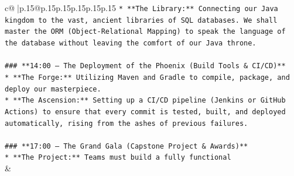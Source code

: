 \documentclass{article}
\begin{document}
{\begin{supertabular}{c@{$\;$}|p{.15\linewidth}@{}p{.15\linewidth}p{.15\linewidth}p{.15\linewidth}p{.15\linewidth}p{.15\linewidth}}
{{{\texttt{*   **The Library:** Connecting our Java kingdom to the vast, ancient libraries of SQL databases. We shall master the ORM (Object{-}Relational Mapping) to speak the language of the database without leaving the comfort of our Java throne.} \\
\\ 
\texttt{\#\#\# **14:00 – The Deployment of the Phoenix (Build Tools \& CI/CD)**} \\
\texttt{*   **The Forge:** Utilizing Maven and Gradle to compile, package, and deploy our masterpiece.} \\
\texttt{*   **The Ascension:** Setting up a CI/CD pipeline (Jenkins or GitHub Actions) to ensure that every commit is tested, built, and deployed automatically, rising from the ashes of previous failures.} \\
\\ 
\texttt{\#\#\# **17:00 – The Grand Gala (Capstone Project \& Awards)**} \\
\texttt{*   **The Project:** Teams must build a fully functional} \\
            }
        }
    }
    & \\ \\


\end{supertabular}}
\end{document}
